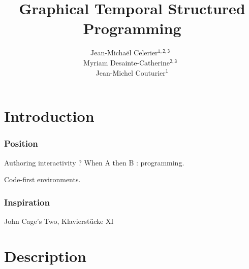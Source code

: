 \documentclass{beamer}
\title{Graphical Temporal Structured Programming}
\subtitle{}
\date{}
\author{Jean-Michaël Celerier$\mathsf{^{1,2,3}}$~\\ Myriam Desainte-Catherine$\mathsf{^{2,3}}$~\\ Jean-Michel Couturier$\mathsf{^{1}}$}
\institute{1: Blue Yeti~\\2: LaBRI~\\3: PoSET}
\begin{document}
    
\maketitle
\begin{frame}
	\tableofcontents
\end{frame}
\section{Introduction}

\begin{frame}
    \frametitle{Position}    
    \Large
    Authoring interactivity ?
    When A then B : programming.
    
    Code-first environments.
    
\end{frame}

\begin{frame}
    \frametitle{Inspiration}
    \Large
    John Cage's Two, Klavierstücke XI
\end{frame}

\section{Description}
\begin{frame}
    \Huge
\end{frame}    
\begin{frame}[plain]
\end{frame}
\end{document}
